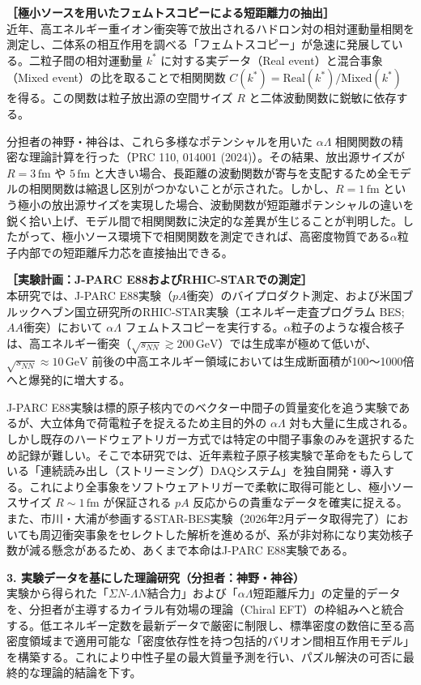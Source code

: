 \documentclass[11pt,a4j,dvipdfmx]{jarticle} 					%
\newcommand{\研究課題名}{加速器実験による短距離バリオン間相互作用の解明と中性子星ハイペロンパズルの解決}
\newcommand{\研究機関名}{東北大学}
\newcommand{\研究代表者氏名}{市川裕大}
\newcommand{\研究期間の最終元号年度}{13}  %
\begin{document}
\noindent
\textbf{［極小ソースを用いたフェムトスコピーによる短距離力の抽出］}\\
近年、高エネルギー重イオン衝突等で放出されるハドロン対の相対運動量相関を測定し、二体系の相互作用を調べる「フェムトスコピー」が急速に発展している。二粒子間の相対運動量 $k^*$ に対する実データ（Real event）と混合事象（Mixed event）の比を取ることで相関関数 $C(k^*) = \text{Real}(k^*) / \text{Mixed}(k^*)$ を得る。この関数は粒子放出源の空間サイズ $R$ と二体波動関数に鋭敏に依存する。

分担者の神野・神谷は、これら多様なポテンシャルを用いた $\alpha\Lambda$ 相関関数の精密な理論計算を行った（PRC 110, 014001 (2024)）。その結果、放出源サイズが $R = 3\,\text{fm}$ や $5\,\text{fm}$ と大きい場合、長距離の波動関数が寄与を支配するため全モデルの相関関数は縮退し区別がつかないことが示された。しかし、$R = 1\,\text{fm}$ という極小の放出源サイズを実現した場合、波動関数が短距離ポテンシャルの違いを鋭く拾い上げ、モデル間で相関関数に決定的な差異が生じることが判明した。したがって、極小ソース環境下で相関関数を測定できれば、高密度物質である$\alpha$粒子内部での短距離斥力芯を直接抽出できる。

\noindent
\textbf{［実験計画：J-PARC E88およびRHIC-STARでの測定］}\\
本研究では、J-PARC E88実験（$pA$衝突）のバイプロダクト測定、および米国ブルックヘブン国立研究所のRHIC-STAR実験（エネルギー走査プログラム BES; $AA$衝突）において $\alpha\Lambda$ フェムトスコピーを実行する。$\alpha$粒子のような複合核子は、高エネルギー衝突（$\sqrt{s_{NN}} \gtrsim 200\,\text{GeV}$）では生成率が極めて低いが、$\sqrt{s_{NN}} \approx 10\,\text{GeV}$ 前後の中高エネルギー領域においては生成断面積が100〜1000倍へと爆発的に増大する。

J-PARC E88実験は標的原子核内でのベクター中間子の質量変化を追う実験であるが、大立体角で荷電粒子を捉えるため主目的外の $\alpha\Lambda$ 対も大量に生成される。しかし既存のハードウェアトリガー方式では特定の中間子事象のみを選択するため記録が難しい。そこで本研究では、近年素粒子原子核実験で革命をもたらしている「連続読み出し（ストリーミング）DAQシステム」を独自開発・導入する。これにより全事象をソフトウェアトリガーで柔軟に取得可能とし、極小ソースサイズ $R \sim 1\,\text{fm}$ が保証される $pA$ 反応からの貴重なデータを確実に捉える。また、市川・大浦が参画するSTAR-BES実験（2026年2月データ取得完了）においても周辺衝突事象をセレクトした解析を進めるが、系が非対称になり実効核子数が減る懸念があるため、あくまで本命はJ-PARC E88実験である。

\vspace*{1zw}
\noindent
\textbf{3. 実験データを基にした理論研究（分担者：神野・神谷）}\\
実験から得られた「$\Sigma N$-$\Lambda N$結合力」および「$\alpha\Lambda$短距離斥力」の定量的データを、分担者が主導するカイラル有効場の理論（Chiral EFT）の枠組みへと統合する。低エネルギー定数を最新データで厳密に制限し、標準密度の数倍に至る高密度領域まで適用可能な「密度依存性を持つ包括的バリオン間相互作用モデル」を構築する。これにより中性子星の最大質量予測を行い、パズル解決の可否に最終的な理論的結論を下す。
\end{document}
